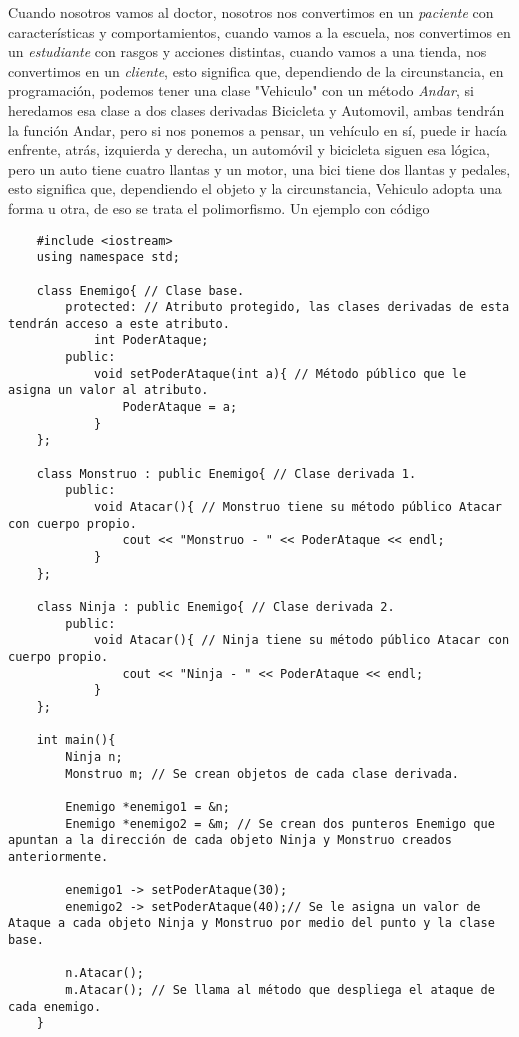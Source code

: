 Cuando nosotros vamos al doctor, nosotros nos convertimos en un \textit{paciente} con características y comportamientos, cuando vamos a la escuela, nos convertimos en un \textit{estudiante} con rasgos y acciones distintas, cuando vamos a una tienda, nos convertimos en un \textit{cliente}, esto significa que, dependiendo de la circunstancia, en programación, podemos tener una clase "Vehiculo" con un método \textit{Andar}, si heredamos esa clase a dos clases derivadas Bicicleta y Automovil, ambas tendrán la función Andar, pero si nos ponemos a pensar, un vehículo en sí, puede ir hacía enfrente, atrás, izquierda y derecha, un automóvil y bicicleta siguen esa lógica, pero un auto tiene cuatro llantas y un motor, una bici tiene dos llantas y pedales, esto significa que, dependiendo el objeto y la circunstancia, Vehiculo adopta una forma u otra, de eso se trata el polimorfismo. Un ejemplo con código
\begin{lstlisting}
    #include <iostream>
    using namespace std;
    
    class Enemigo{ // Clase base.
        protected: // Atributo protegido, las clases derivadas de esta tendrán acceso a este atributo.
            int PoderAtaque;
        public:
            void setPoderAtaque(int a){ // Método público que le asigna un valor al atributo.
                PoderAtaque = a;
            }
    };
    
    class Monstruo : public Enemigo{ // Clase derivada 1.
        public:
            void Atacar(){ // Monstruo tiene su método público Atacar con cuerpo propio.
                cout << "Monstruo - " << PoderAtaque << endl;
            }
    };
    
    class Ninja : public Enemigo{ // Clase derivada 2.
        public:
            void Atacar(){ // Ninja tiene su método público Atacar con cuerpo propio.
                cout << "Ninja - " << PoderAtaque << endl;
            }
    };
    
    int main(){
        Ninja n;
        Monstruo m; // Se crean objetos de cada clase derivada.
        
        Enemigo *enemigo1 = &n;
        Enemigo *enemigo2 = &m; // Se crean dos punteros Enemigo que apuntan a la dirección de cada objeto Ninja y Monstruo creados anteriormente.
        
        enemigo1 -> setPoderAtaque(30);
        enemigo2 -> setPoderAtaque(40);// Se le asigna un valor de Ataque a cada objeto Ninja y Monstruo por medio del punto y la clase base.
        
        n.Atacar();
        m.Atacar(); // Se llama al método que despliega el ataque de cada enemigo.
    }
\end{lstlisting}

